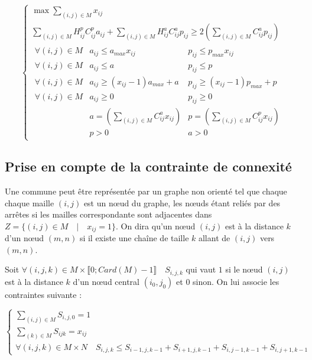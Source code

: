 \documentclass[a4paper,11pt] {article}
\begin{document}
\begin{equation}
\left\{
\begin{array}{l}
\max \sum\limits_{(i,j)\in M} x_{ij}\\
\sum\limits_{(i,j)\in M} H^p_{ij}C^p_{ij}a_{ij} + \sum\limits_{(i,j)\in M} H^a_{ij}C^a_{ij}p_{ij} \geq 2(\sum\limits_{(i,j)\in M} C^a_{ij}p_{ij})\\
	\begin{array}{lll}
		\forall{(i,j)} \in M&a_{ij}\leq a_{max}x_{ij}&p_{ij}\leq p_{max}x_{ij}\\
		\forall{(i,j)} \in M&a_{ij}\leq a&p_{ij}\leq p\\
		\forall{(i,j)} \in M&a_{ij}\geq (x_{ij}-1)a_{max}+a&p_{ij}\geq (x_{ij}-1)p_{max}+p\\
		\forall{(i,j)} \in M&a_{ij} \geq 0&p_{ij} \geq 0\\
		&a = (\sum\limits_{(i,j)\in M} C^a_{ij}x_{ij})&p = (\sum\limits_{(i,j)\in M} C^p_{ij}x_{ij})\\
		&p > 0&a > 0
	\end{array}
\end{array}
\right.
\end{equation}

\subsection{Prise en compte de la contrainte de connexité}

Une commune peut être représentée par un graphe non orienté tel que chaque chaque maille $(i,j)$ est un nœud du graphe, les nœuds étant reliés par des arrêtes si les mailles correspondante sont adjacentes dans $Z=\{(i,j)\in M\quad |\quad x_{ij}=1\}$. On dira qu'un nœud $(i,j)$ est à la distance $k$ d'un nœud $(m,n)$ si il existe une chaîne de taille $k$ allant de $(i,j)$ vers $(m,n)$.


Soit $\forall{(i,j,k)}\in M\times\llbracket 0;Card(M)-1\rrbracket \quad S_{i,j,k}$ qui vaut $1$ si le nœud $(i,j)$ est à la distance $k$ d'un nœud central $(i_0,j_0)$ et $0$ sinon. On lui associe les contraintes suivante : 

\begin{equation}
\left\{
\begin{array}{l}
\sum\limits_{(i,j)\in M} S_{i,j,0} = 1\\
\sum\limits_{(k)\in M} S_{ijk} = x_{ij}\\
\forall{(i,j,k)}\in M\times N \quad S_{i,j,k}\leq S_{i-1,j,k-1} + S_{i+1,j,k-1} + S_{i,j-1,k-1} + S_{i,j+1,k-1}
\end{array}
\right.
\end{equation}
\end{document}

